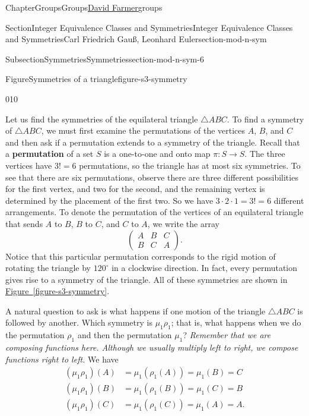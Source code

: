\documentclass[oneside,10pt,]{book}
\newcommand{\xreffont}{\relax}
\newcommand{\terminology}[1]{\textbf{#1}}
\numberwithin{equation}{section}
\begin{document}
\begin{chapterptx}{Chapter}{Groups}{}{Groups}{\hyperlink{dfarmer}{David Farmer}}{}{groups}
\begin{sectionptx}{Section}{Integer Equivalence Classes and Symmetries}{}{Integer Equivalence Classes and Symmetries}{Carl Friedrich Gauß, Leonhard Euler}{}{section-mod-n-sym}
\begin{subsectionptx}{Subsection}{Symmetries}{}{Symmetries}{}{}{section-mod-n-sym-6}
\begin{figureptx}{Figure}{Symmetries of a triangle}{figure-s3-symmetry}{}
\begin{image}{0}{1}{0}{}
{\begin{tikzpicture}[scale=0.7]
\end{tikzpicture}%
}%
\end{image}%
\tcblower
\end{figureptx}%
Let us find the symmetries of the equilateral triangle \(\bigtriangleup ABC\).  To find a symmetry of \(\bigtriangleup ABC\), we must first examine the permutations of the vertices \(A\), \(B\), and \(C\) and then ask if a permutation extends to a symmetry of the triangle.  Recall that a \terminology{permutation} of a set \(S\) is a one-to-one and onto map \(\pi :S \rightarrow S\).  The three vertices have \(3! = 6\) permutations, so the triangle has at most six symmetries.  To see that there are six permutations, observe there are three different possibilities for the first vertex, and two for the second, and the remaining vertex is determined by the placement of the first two.  So we have \(3 \cdot 2 \cdot 1 = 3! = 6\) different arrangements.  To denote the permutation of the vertices of an equilateral triangle that sends \(A\) to \(B\), \(B\) to \(C\), and \(C\) to \(A\), we write the array%
\begin{equation*}
\begin{pmatrix}
A & B & C \\
B & C & A
\end{pmatrix}\text{.}
\end{equation*}
Notice that this particular permutation corresponds to the rigid motion of rotating the triangle by \(120^{\circ}\) in a clockwise direction.  In fact, every permutation gives rise to a symmetry of the triangle.  All of these symmetries are shown in \hyperref[figure-s3-symmetry]{Figure~{\xreffont\ref{figure-s3-symmetry}}}.%
\par
A natural question to ask is what happens if one motion of the triangle \(\bigtriangleup ABC\) is followed by another.  Which symmetry is \(\mu_1 \rho_1\); that is, what happens when we do the permutation \(\rho_1\) and then the permutation \(\mu_1\)?  \emph{Remember that we are composing functions here.  Although we usually multiply left to right, we compose functions right to left.} We have%
\begin{align*}
(\mu_1 \rho_1)(A) & = \mu_1( \rho_1( A ) ) = \mu_1( B ) = C\\
(\mu_1 \rho_1)(B) & = \mu_1( \rho_1( B ) ) = \mu_1( C ) = B\\
(\mu_1 \rho_1)(C) & = \mu_1( \rho_1( C ) ) = \mu_1( A ) = A\text{.}
\end{align*}
%
\par

\end{subsectionptx}
\end{sectionptx}
\end{chapterptx}
\end{document}

